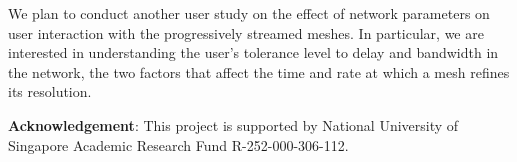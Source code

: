 We plan to conduct another user study on the effect
of network parameters on user interaction with the progressively
streamed meshes. In particular, we are interested in understanding
the user's tolerance level to delay and bandwidth in the network,
the two factors that affect the time and rate at which a mesh 
refines its resolution.

\textbf{Acknowledgement}:
This project is supported by National University of Singapore Academic
Research Fund R-252-000-306-112.

